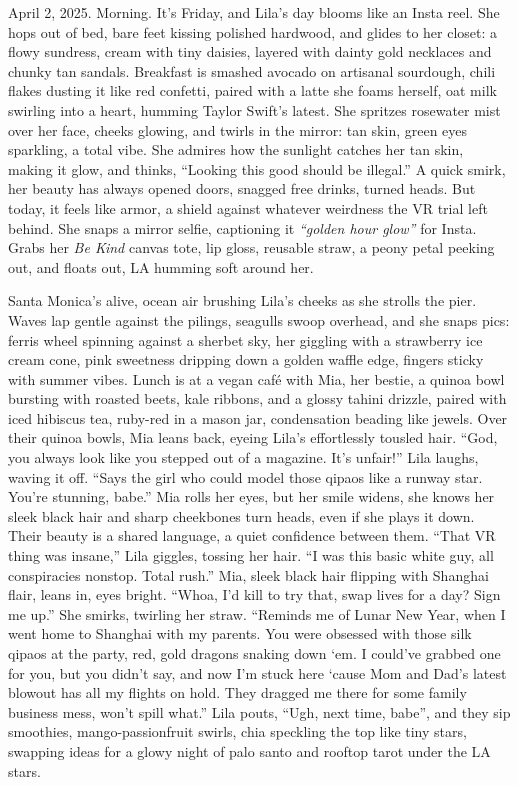 \documentclass[12pt]{article} %
\begin{document}
April 2, 2025. Morning. It’s Friday, and \textnormal{Lila}’s day blooms like an Insta reel. She hops out of bed, bare feet kissing polished hardwood, and glides to her closet: a flowy sundress, cream with tiny daisies, layered with dainty gold necklaces and chunky tan sandals. Breakfast is smashed avocado on artisanal sourdough, chili flakes dusting it like red confetti, paired with a latte she foams herself, oat milk swirling into a heart, humming \textnormal{Taylor Swift}’s latest. She spritzes rosewater mist over her face, cheeks glowing, and twirls in the mirror: tan skin, green eyes sparkling, a total vibe. She admires how the sunlight catches her tan skin, making it glow, and thinks, “Looking this good should be illegal.” A quick smirk, her beauty has always opened doors, snagged free drinks, turned heads. But today, it feels like armor, a shield against whatever weirdness the VR trial left behind. She snaps a mirror selfie, captioning it \textit{“golden hour glow”} for Insta. Grabs her \textit{Be Kind} canvas tote, lip gloss, reusable straw, a peony petal peeking out, and floats out, LA humming soft around her.

Santa Monica’s alive, ocean air brushing \textnormal{Lila}’s cheeks as she strolls the pier. Waves lap gentle against the pilings, seagulls swoop overhead, and she snaps pics: ferris wheel spinning against a sherbet sky, her giggling with a strawberry ice cream cone, pink sweetness dripping down a golden waffle edge, fingers sticky with summer vibes. Lunch is at a vegan café with \textnormal{Mia}, her bestie, a quinoa bowl bursting with roasted beets, kale ribbons, and a glossy tahini drizzle, paired with iced hibiscus tea, ruby-red in a mason jar, condensation beading like jewels. Over their quinoa bowls, \textnormal{Mia} leans back, eyeing \textnormal{Lila}’s effortlessly tousled hair. “God, you always look like you stepped out of a magazine. It’s unfair!” \textnormal{Lila} laughs, waving it off. “Says the girl who could model those qipaos like a runway star. You’re stunning, babe.” \textnormal{Mia} rolls her eyes, but her smile widens, she knows her sleek black hair and sharp cheekbones turn heads, even if she plays it down. Their beauty is a shared language, a quiet confidence between them. “That VR thing was insane,” \textnormal{Lila} giggles, tossing her hair. “I was this basic white guy, all conspiracies nonstop. Total rush.” \textnormal{Mia}, sleek black hair flipping with Shanghai flair, leans in, eyes bright. “Whoa, I’d kill to try that, swap lives for a day? Sign me up.” She smirks, twirling her straw. “Reminds me of Lunar New Year, when I went home to Shanghai with my parents. You were obsessed with those silk qipaos at the party, red, gold dragons snaking down ‘em. I could’ve grabbed one for you, but you didn’t say, and now I’m stuck here ‘cause Mom and Dad’s latest blowout has all my flights on hold. They dragged me there for some family business mess, won’t spill what.” \textnormal{Lila} pouts, “Ugh, next time, babe”, and they sip smoothies, mango-passionfruit swirls, chia speckling the top like tiny stars, swapping ideas for a glowy night of palo santo and rooftop tarot under the LA stars.
\end{document}
